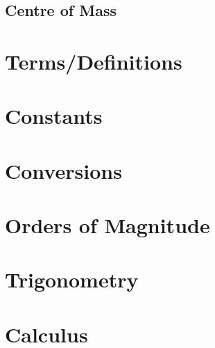 \documentclass[letterpaper,10pt]{article}
\begin{document}
\begin{multicols}{2}
\subsection{Centre of Mass}

\appendix
\section{Terms/Definitions}

\section{Constants}

\section{Conversions}

\section{Orders of Magnitude}

\section{Trigonometry}

\section{Calculus}

\end{multicols}
\end{document}
